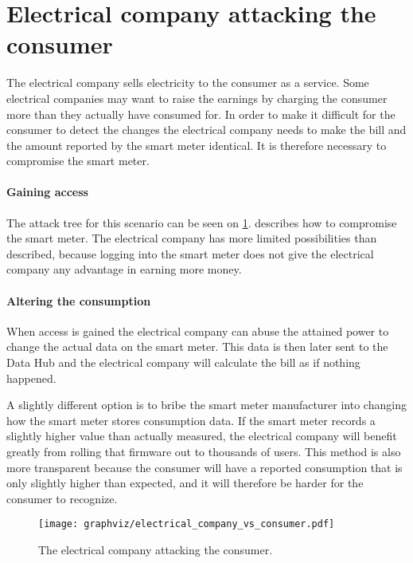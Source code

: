 \section{Electrical company attacking the consumer}
The electrical company sells electricity to the consumer as a service.
Some electrical companies may want to raise the earnings by charging the consumer more than they actually have consumed for.
In order to make it difficult for the consumer to detect the changes the electrical company needs to make the bill and the amount reported by the smart meter identical.
It is therefore necessary to compromise the smart meter.

\paragraph{Gaining access}
The attack tree for this scenario can be seen on \cref{electrical_vs_consumer}.
 describes how to compromise the smart meter.
The electrical company has more limited possibilities than described, because logging into the smart meter does not give the electrical company any advantage in earning more money.

\paragraph{Altering the consumption}
When access is gained the electrical company can abuse the attained power to change the actual data on the smart meter.
This data is then later sent to the Data Hub and the electrical company will calculate the bill as if nothing happened.

A slightly different option is to bribe the smart meter manufacturer into changing how the smart meter stores consumption data.
If the smart meter records a slightly higher value than actually measured, the electrical company will benefit greatly from rolling that firmware out to thousands of users.
This method is also more transparent because the consumer will have a reported consumption that is only slightly higher than expected, and it will therefore be harder for the consumer to recognize.

\begin{figure}
  \begin{center}
    \texttt{[image: graphviz/electrical\_company\_vs\_consumer.pdf]}
  \end{center}
  \caption{The electrical company attacking the consumer.}
  \label{electrical_vs_consumer}
\end{figure}
